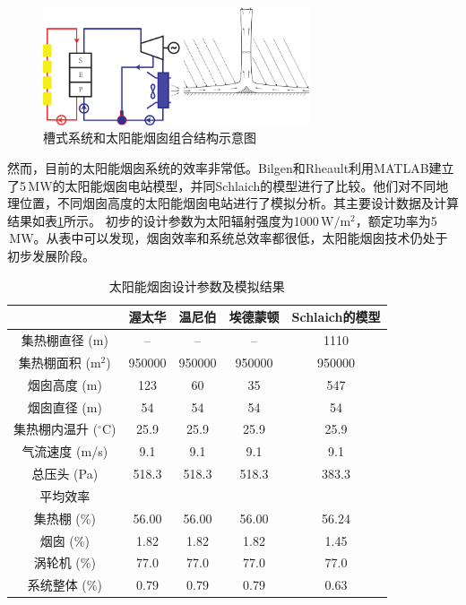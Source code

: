 \begin{figure}[!ht]
\centering 
\includegraphics[width=0.7\textwidth]{fig/CombinedSolarChimney}
\caption{槽式系统和太阳能烟囱组合结构示意图}\label{fig:CombinedSolarChimney}
\end{figure}
然而，目前的太阳能烟囱系统的效率非常低。Bilgen和Rheault利用MATLAB建立了5$\,\mathrm{MW}$的太阳能烟囱电站模型，并同Schlaich的模型进行了比较\cite{Bilgen2005}。他们对不同地理位置，不同烟囱高度的太阳能烟囱电站进行了模拟分析。其主要设计数据及计算结果如表\ref{tab:sc}所示。 初步的设计参数为太阳辐射强度为1000$\,\mathrm{W/m^2}$，额定功率为5$\,\mathrm{MW}$。从表中可以发现，烟囱效率和系统总效率都很低，太阳能烟囱技术仍处于初步发展阶段。
\begin{table}[htbp]
\setlength{\abovecaptionskip}{0pt}
	\caption{太阳能烟囱设计参数及模拟结果}
	\centering
	\begin{tabular}{ccccc}
		\toprule
			&渥太华    &温尼伯    &埃德蒙顿    &Schlaich的模型\\
		\midrule
		集热棚直径 (m)    &	--	&	--	&	--	&	1110 \\
  集热棚面积 ($\mathrm{m^2}$)    & 950000    & 950000	&	950000	&	950000\\
  烟囱高度 (m)    &123    &60    &    35&    547\\
  烟囱直径 (m)    &54    &54    &54    &54\\
  集热棚内温升 ($\mathrm{^\circ C}$)    &25.9    &25.9    &25.9    &25.9\\
  气流速度 (m/s)&9.1    &9.1    &9.1    &9.1\\
  总压头 (Pa)&518.3    &518.3    &518.3    &383.3\\
  平均效率\\
  集热棚 (\%)    &56.00    &56.00    &56.00    &56.24\\
  烟囱 (\%)    &1.82    &1.82    &1.82    &1.45\\
  涡轮机 (\%)    &77.0    &77.0    &77.0    &77.0\\
  系统整体 (\%)    &0.79    &0.79    &0.79    &0.63\\
		\bottomrule
	\end{tabular}
	\label{tab:sc}
\end{table}
 
